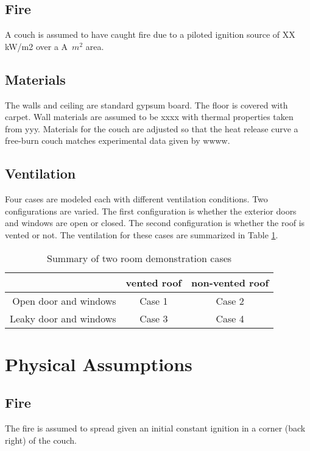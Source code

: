 \documentclass[11pt]{book}
\begin{document}
\subsection{Fire}
A couch is assumed to have caught fire due to a piloted ignition source of XX kW/m2 over
a A~$m^2$ area.


\subsection{Materials}
The walls and ceiling are standard gypsum board.  The floor is
covered with carpet.  Wall materials are assumed to be xxxx with thermal properties taken from yyy.  Materials for the couch
are adjusted so that the heat release curve a free-burn couch matches experimental data given by wwww.

\subsection{Ventilation}
Four cases are modeled each with different ventilation conditions.  Two configurations are varied.  The first configuration is whether the exterior doors and windows are open or closed.  The second configuration is whether the roof is vented or not.  The ventilation for these cases are summarized in Table \ref{tab:demoranch}.

\begin{table}[ht]
\caption{Summary of two room demonstration cases}
\vspace{0.1in}
\label{tab:demoranch}
\begin{center}
\begin{tabular}{|r||c|c|}
  \hline
   & vented roof & non-vented roof \\ \hline
  Open door and windows & Case 1 & Case 2 \\
  Leaky door and windows & Case 3 & Case 4 \\
  \hline
  \end{tabular}
\end{center}
\end{table}

\section{Physical Assumptions}
\subsection{Fire}
The fire is assumed to spread given an initial constant ignition in a corner
(back right) of the couch.
\end{document}
